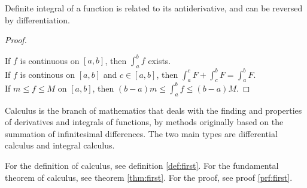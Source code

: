     \begin{theorem}
        \label{thm:first}
        Definite integral of a function is related to its antiderivative, and can be reversed by differentiation.
    \end{theorem}
    \begin{proof}
        \label{prf:first}
        If $f$ is continuous on $[a, b]$, 
            then $\int_a^b f$ exists. \\
        If $f$ is continous on $[a, b]$ and $c \in [a, b]$, 
            then $\int_a^c F + \int_c^b F = \int_a^b F$. \\
        If $m \leq f \leq M$ on $[a, b]$, 
            then $(b - a)m \leq \int_a^b f \leq (b - a)M$.
    \end{proof}
    \begin{definition}
        \label{def:first}
        Calculus is the branch of mathematics that deals with the finding and properties of derivatives and integrals of functions, by methods originally based on the summation of infinitesimal differences. The two main types are differential calculus and integral calculus.
    \end{definition}
    For the definition of calculus, see definition \ref{def:first}. For the fundamental theorem of calculus, see theorem \ref{thm:first}. For the proof, see proof \ref{prf:first}.
		

